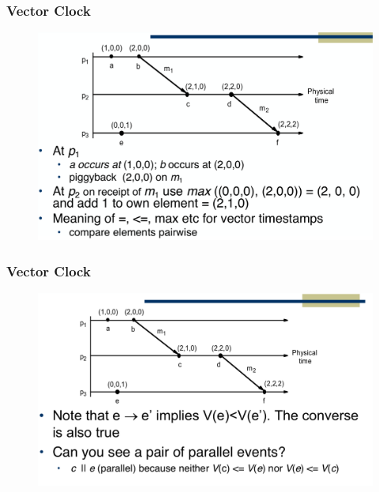 \begin{frame}
    \frametitle{Vector Clock}
    \begin{figure}
        \centering
        \includegraphics[scale=0.3]{./figures/vector-clock2.png}
    \end{figure}
\end{frame}

\begin{frame}
    \frametitle{Vector Clock}
    \begin{figure}
        \centering
        \includegraphics[scale=0.3]{./figures/vector-clock3.png}
    \end{figure}
\end{frame}

